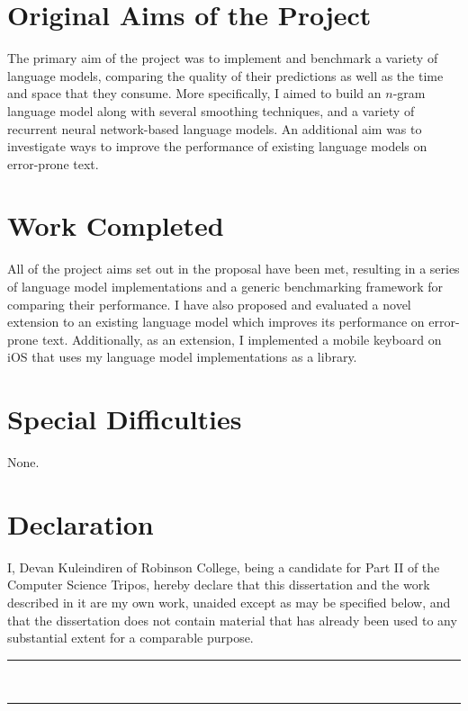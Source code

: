 \documentclass[a4paper, 12pt]{report}
\begin{document}
\section*{Original Aims of the Project}
The primary aim of the project was to implement and benchmark a variety of language models, comparing the quality of their predictions as well as the time and space that they consume. More specifically, I aimed to build an $n$-gram language model along with several smoothing techniques, and a variety of recurrent neural network-based language models. An additional aim was to investigate ways to improve the performance of existing language models on error-prone text.

\section*{Work Completed}
All of the project aims set out in the proposal have been met, resulting in a series of language model implementations and a generic benchmarking framework for comparing their performance. I have also proposed and evaluated a novel extension to an existing language model which improves its performance on error-prone text. Additionally, as an extension, I implemented a mobile keyboard on iOS that uses my language model implementations as a library.

\section*{Special Difficulties}
None.

 
\newpage
\section*{Declaration}

I, Devan Kuleindiren of Robinson College, being a candidate for Part II of the Computer Science Tripos, hereby declare that this dissertation and the work described in it are my own work, unaided except as may be specified below, and that the dissertation does not contain material that has already been used to any substantial extent for a comparable purpose.

\vspace{1cm}
\begin{multicols}{2}

\rule{5cm}{0.15mm} \\

\columnbreak

\rule{5cm}{0.15mm} \\

\end{multicols}
\end{document}
